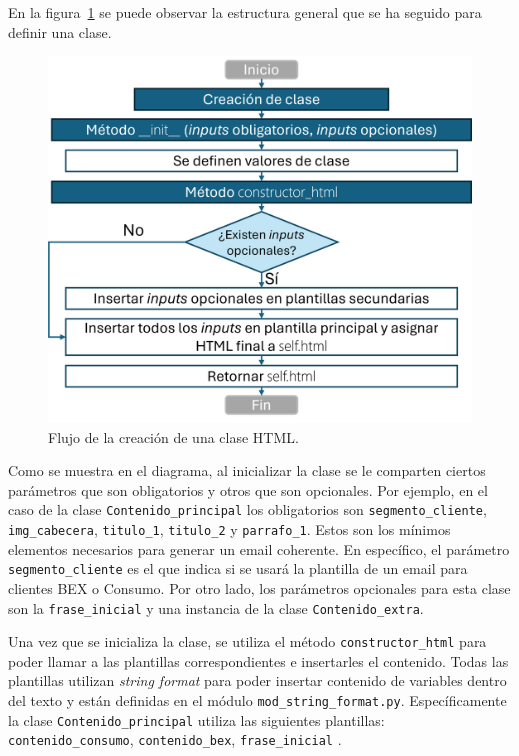 En la figura~\ref{fig:DefinicionClase} se puede observar la estructura general que se ha seguido para definir una clase.

\begin{figure}[!htpb]
    \centering
    \includegraphics[width=0.7\linewidth]{Figures/Flujo_creacion_clase.png}
    \caption{Flujo de la creación de una clase HTML.}
    \label{fig:DefinicionClase}
\end{figure}

Como se muestra en el diagrama, al inicializar la clase se le comparten ciertos parámetros que son obligatorios y otros que son opcionales. Por ejemplo, en el caso de la clase \texttt{Contenido\_principal}  los obligatorios son \texttt{segmento\_cliente}, \\ \texttt{img\_cabecera}, \texttt{titulo\_1}, \texttt{titulo\_2} y \texttt{parrafo\_1}. Estos son los mínimos elementos necesarios para generar un email coherente. En específico, el parámetro \texttt{segmento\_cliente} es el que indica si se usará la plantilla de un email para clientes BEX o Consumo. Por otro lado, los parámetros opcionales para esta clase son la \texttt{frase\_inicial} y una instancia de la clase \texttt{Contenido\_extra}.

Una vez que se inicializa la clase, se utiliza el método \texttt{constructor\_html} para poder llamar a las plantillas correspondientes e insertarles el contenido. Todas las plantillas utilizan \textit{string format} para poder insertar contenido de variables dentro del texto y están definidas en el módulo \texttt{mod\_string\_format.py}. Específicamente la clase \texttt{Contenido\_principal} utiliza las siguientes plantillas: \\ \texttt{contenido\_consumo}, \texttt{contenido\_bex}, \texttt{frase\_inicial} . 

